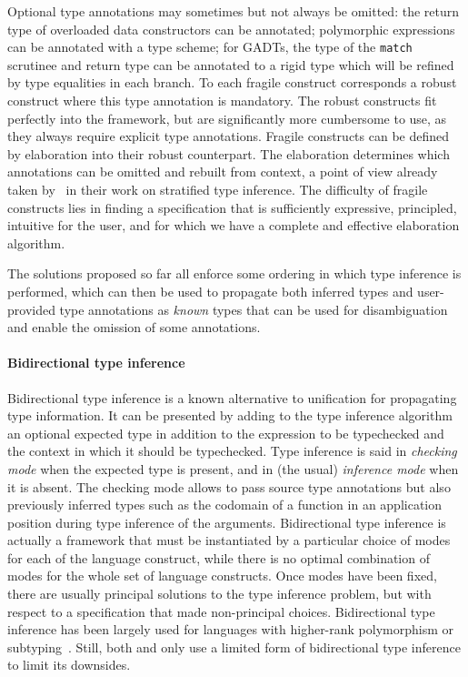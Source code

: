 \documentclass[acmsmall,screen,nonacm]{acmart}
\begin{document}
Optional type annotations may sometimes but not always be omitted: the
return type of overloaded data constructors can be annotated; polymorphic
expressions can be annotated with a type scheme; for GADTs, the type of the
\texttt{match} scrutinee and return type can be annotated to a rigid type
which will be 
refined by type equalities in each branch. To each fragile construct
corresponds a robust construct where this type annotation is mandatory. The
robust constructs fit perfectly into the \ML framework, but are
significantly more cumbersome to use, as they always require explicit type
annotations.  Fragile constructs can be defined by elaboration into their
robust counterpart. The elaboration determines which annotations can be
omitted and rebuilt from context, a point of view already taken by~\citet
{Pottier-Regis-Gianas/stratified@popl06} in their work on stratified type
inference.
%
The difficulty of fragile constructs lies in finding a specification
that is sufficiently expressive, principled, intuitive for the user,
and for which we have a complete and effective elaboration algorithm.

The solutions proposed so far all enforce some ordering in which type
inference is performed, which can then be used to propagate both inferred
types and user-provided type annotations as \emph{known} types that can be
used for disambiguation and enable the omission of some annotations.

\paragraph{Bidirectional type inference}

Bidirectional type inference is a known alternative to unification for
propagating type information. It can be presented by adding to the type
inference algorithm an optional expected type in addition to the expression
to be typechecked and the context in which it should be typechecked.  Type
inference is said in \emph{checking mode} when the expected type is present,
and in (the usual) \emph{inference mode} when it is absent. The checking
mode allows to pass source type annotations but also previously inferred
types such as the codomain of a function in an application position during
type inference of the arguments.
%
Bidirectional type inference is actually a framework that must be
instantiated by a particular choice of modes for each of the language
construct, while there is no optimal combination of modes for the whole set
of language constructs. Once modes have been fixed, there are usually
principal solutions to the type inference problem, but with respect to a
specification that made non-principal choices.
%
Bidirectional type inference has been largely used for languages with
higher-rank polymorphism or subtyping~. Still, both \OCaml
and \Haskell only use a limited form of bidirectional type inference to
limit its downsides.
\end{document}
